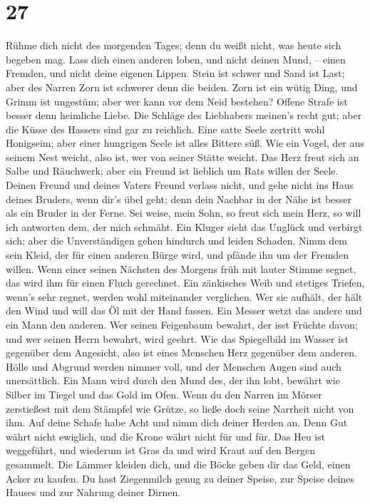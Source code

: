 \hypertarget{section-26}{%
\section{27}\label{section-26}}

 Rühme dich nicht des morgenden Tages; denn du weißt
nicht, was heute sich begeben mag.  Lass dich einen
anderen loben, und nicht deinen Mund, -- einen Fremden, und nicht deine
eigenen Lippen.  Stein ist schwer und Sand ist Last; aber
des Narren Zorn ist schwerer denn die beiden.  Zorn ist
ein wütig Ding, und Grimm ist ungestüm; aber wer kann vor dem Neid
bestehen?  Offene Strafe ist besser denn heimliche Liebe.
 Die Schläge des Liebhabers meinen's recht gut; aber die
Küsse des Hassers sind gar zu reichlich.  Eine satte Seele
zertritt wohl Honigseim; aber einer hungrigen Seele ist alles Bittere
süß.  Wie ein Vogel, der aus seinem Nest weicht, also ist,
wer von seiner Stätte weicht.  Das Herz freut sich an
Salbe und Räuchwerk; aber ein Freund ist lieblich um Rats willen der
Seele.  Deinen Freund und deines Vaters Freund verlass
nicht, und gehe nicht ins Haus deines Bruders, wenn dir's übel geht;
denn dein Nachbar in der Nähe ist besser als ein Bruder in der Ferne.
 Sei weise, mein Sohn, so freut sich mein Herz, so will
ich antworten dem, der mich schmäht.  Ein Kluger sieht
das Unglück und verbirgt sich; aber die Unverständigen gehen hindurch
und leiden Schaden.  Nimm dem sein Kleid, der für einen
anderen Bürge wird, und pfände ihn um der Fremden willen.
 Wenn einer seinen Nächsten des Morgens früh mit lauter
Stimme segnet, das wird ihm für einen Fluch gerechnet. 
Ein zänkisches Weib und stetiges Triefen, wenn's sehr regnet, werden
wohl miteinander verglichen.  Wer sie aufhält, der hält
den Wind und will das Öl mit der Hand fassen.  Ein Messer
wetzt das andere und ein Mann den anderen.  Wer seinen
Feigenbaum bewahrt, der isst Früchte davon; und wer seinen Herrn
bewahrt, wird geehrt.  Wie das Spiegelbild im Wasser ist
gegenüber dem Angesicht, also ist eines Menschen Herz gegenüber dem
anderen.  Hölle und Abgrund werden nimmer voll, und der
Menschen Augen sind auch unersättlich.  Ein Mann wird
durch den Mund des, der ihn lobt, bewährt wie Silber im Tiegel und das
Gold im Ofen.  Wenn du den Narren im Mörser zerstießest
mit dem Stämpfel wie Grütze, so ließe doch seine Narrheit nicht von ihm.
 Auf deine Schafe habe Acht und nimm dich deiner Herden
an.  Denn Gut währt nicht ewiglich, und die Krone währt
nicht für und für.  Das Heu ist weggeführt, und wiederum
ist Gras da und wird Kraut auf den Bergen gesammelt.  Die
Lämmer kleiden dich, und die Böcke geben dir das Geld, einen Acker zu
kaufen.  Du hast Ziegenmilch genug zu deiner Speise, zur
Speise deines Hauses und zur Nahrung deiner Dirnen.

